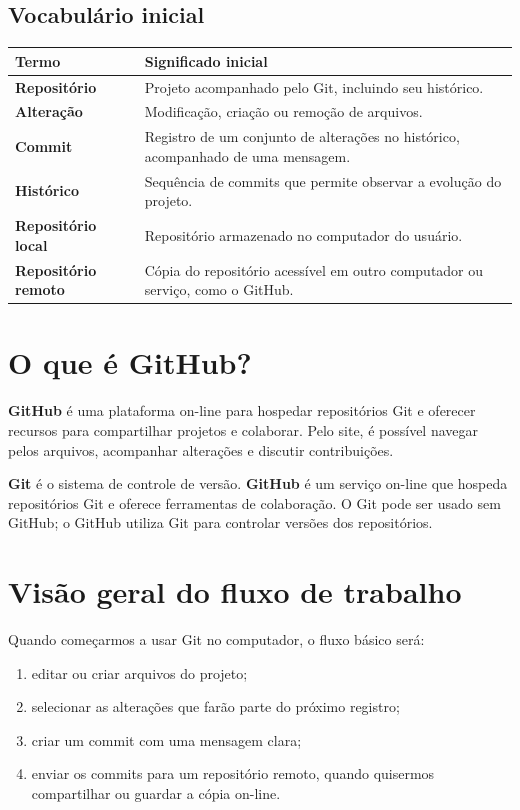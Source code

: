 \documentclass[12pt,a4paper]{article}
\begin{document}
\subsection{Vocabulário inicial}
\begin{tabularx}{\textwidth}{>{\bfseries}p{3.1cm}X}
\toprule
Termo & Significado inicial\\
\midrule
Repositório & Projeto acompanhado pelo Git, incluindo seu histórico.\\
Alteração & Modificação, criação ou remoção de arquivos.\\
Commit & Registro de um conjunto de alterações no histórico, acompanhado de uma mensagem.\\
Histórico & Sequência de commits que permite observar a evolução do projeto.\\
Repositório local & Repositório armazenado no computador do usuário.\\
Repositório remoto & Cópia do repositório acessível em outro computador ou serviço, como o GitHub.\\
\bottomrule
\end{tabularx}

\section{O que é GitHub?}
\textbf{GitHub} é uma plataforma on-line para hospedar repositórios Git e oferecer recursos para compartilhar projetos e colaborar. Pelo site, é possível navegar pelos arquivos, acompanhar alterações e discutir contribuições.

\begin{conceito}
\textbf{Git} é o sistema de controle de versão. \textbf{GitHub} é um serviço on-line que hospeda repositórios Git e oferece ferramentas de colaboração. O Git pode ser usado sem GitHub; o GitHub utiliza Git para controlar versões dos repositórios.
\end{conceito}

\section{Visão geral do fluxo de trabalho}
Quando começarmos a usar Git no computador, o fluxo básico será:
\begin{enumerate}
\item editar ou criar arquivos do projeto;
\item selecionar as alterações que farão parte do próximo registro;
\item criar um commit com uma mensagem clara;
\item enviar os commits para um repositório remoto, quando quisermos compartilhar ou guardar a cópia on-line.
\end{enumerate}
\end{document}

